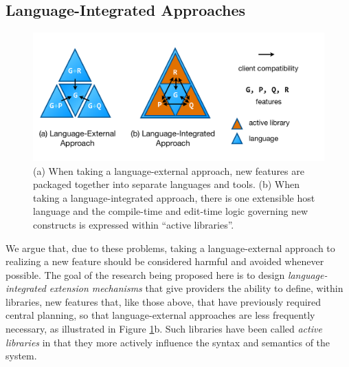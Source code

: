 \subsection{Language-Integrated Approaches}\label{language-integrated-approaches}
\begin{figure}
\begin{center}
\includegraphics[scale=.48]{approaches.pdf}
\end{center}
\vspace{-20px}
\caption{\small (a) When taking a language-external approach, new features are packaged together into separate languages and tools. (b) When taking a language-integrated approach, there is one extensible host language and the compile-time and edit-time logic governing new constructs is expressed within ``active libraries''.}
\label{approaches}
\end{figure}
We argue that, due to these problems, taking a language-external approach to realizing a new feature should be considered harmful and avoided whenever possible. The goal of the research being proposed here is to design \emph{language-integrated extension mechanisms} that give providers the ability to define, within libraries, new features that, like those above, that have previously required central planning, 
so that language-external approaches are less frequently necessary, as illustrated in Figure \ref{approaches}b. 
Such libraries have been called \emph{active libraries}  \cite{activelibraries} in that they more actively influence the syntax and semantics of the system. %

